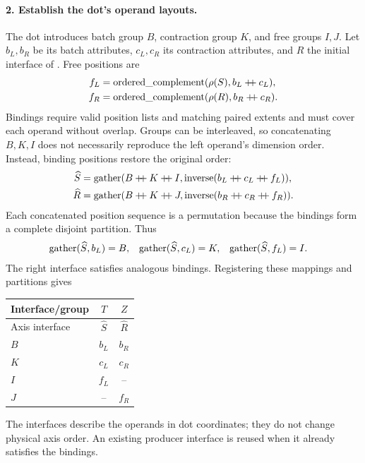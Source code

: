 \paragraph{2. Establish the dot's operand layouts.}
The dot introduces batch group $B$, contraction group $K$, and free groups
$I,J$. Let $b_L,b_R$ be its batch attributes, $c_L,c_R$ its contraction
attributes, and $R$ the initial interface of . Free positions are
\begin{equation}
\begin{aligned}
 f_L&=\operatorname{ordered\_complement}(\rho(S),b_L\mathbin{+\!\!+} c_L),\\
 f_R&=\operatorname{ordered\_complement}(\rho(R),b_R\mathbin{+\!\!+} c_R).
\end{aligned}
\end{equation}
Bindings require valid position lists and matching paired extents and must
cover each operand without overlap. Groups can be interleaved, so concatenating
$B,K,I$ does not necessarily reproduce the left operand's dimension order.
Instead, binding positions restore the original order:
\begin{equation}
\begin{aligned}
 \widehat S&=\gath(B\catseq K\catseq I,
                  \operatorname{inverse}(b_L\catseq c_L\catseq f_L)),\\
 \widehat R&=\gath(B\catseq K\catseq J,
                  \operatorname{inverse}(b_R\catseq c_R\catseq f_R)).
\end{aligned}
\label{eq:rebuilt-interfaces}
\end{equation}
Each concatenated position sequence is a permutation because the bindings
form a complete disjoint partition. Thus
\begin{equation}
\begin{aligned}
 \operatorname{gather}(\widehat S,b_L)&=B,&
 \operatorname{gather}(\widehat S,c_L)&=K,&
 \operatorname{gather}(\widehat S,f_L)&=I.
\end{aligned}
\end{equation}
The right interface satisfies analogous bindings. Registering these mappings
and partitions gives
\begin{center}
\begin{tabular}{@{}lcc@{}}\toprule
Interface/group & $T$ & $Z$\\\midrule
Axis interface & $\widehat S$ & $\widehat R$\\
$B$ & $b_L$ & $b_R$\\
$K$ & $c_L$ & $c_R$\\
$I$ & $f_L$ & --\\
$J$ & -- & $f_R$\\\bottomrule
\end{tabular}
\end{center}
The interfaces describe the operands in dot coordinates; they do not change
physical axis order. An existing producer interface is reused when it already
satisfies the bindings.

